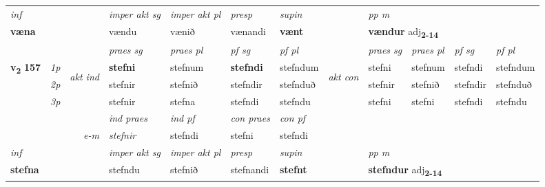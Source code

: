 \begin{longtable}[l]{X>{\footnotesize\itshape}llXXXXlXXXX}
\cmidrule{4-7}
   {\textit{inf}} & &  & \textit{imper akt sg} & \textit{imper akt pl}   & \textit{presp} & \textit{supin}  && \textit{pp m} \\*
  {\textbf{væna}} & && vændu  & vænið   & vænandi &  \textbf{vænt}  && \multicolumn{2}{l}{\textbf{vændur} adj\textbf{\textsubscript{2-14}}} \\*

\midrule

 & &   & \textit{praes sg}  & \textit{praes pl}    & \textit{ pf sg} & \textit{pf pl} & & \textit{praes sg}  & \textit{praes pl}    & \textit{pf sg} & \textit{pf pl }  \\ \cmidrule{4-7} \cmidrule{9-12}
 \multirow{2}{*}{{{\textbf{v{\textsubscript{2}}} \Large{\textbf{157}}}}}  & 1p & \multirow{3}{*}{\begin{turn}{90}\textit{akt ind}\end{turn}} & \textbf{stefni} & stefnum & \textbf{stefndi} & stefndum & \multirow{3}{*}{\begin{turn}{90}\textit{akt con}\end{turn}} &stefni & stefnum & stefndi & stefndum\\*
 & 2p &  &  stefnir  & stefnið & stefndir & stefnduð & & stefnir & stefnið & stefndir & stefnduð \\*
 & 3p &  & stefnir & stefna & stefndi & stefndu & & stefni & stefni& stefndi & stefndu \\*
\cmidrule{4-7} \cmidrule{9-12}

   && &  \textit{ind praes} & \textit{ind pf} & \textit{con praes} & \textit{con pf} \\*
\multicolumn{3}{r}{\textit{e-m}} & stefnir & stefndi & stefni & stefndi \\*

\cmidrule{4-7}
   {\textit{inf}} & &  & \textit{imper akt sg} & \textit{imper akt pl}   & \textit{presp} & \textit{supin}  && \textit{pp m} \\*
  {\textbf{stefna}} & && stefndu  & stefnið   & stefnandi &  \textbf{stefnt}  && \multicolumn{2}{l}{\textbf{stefndur} adj\textbf{\textsubscript{2-14}}} \\*

\midrule


\end{longtable}
